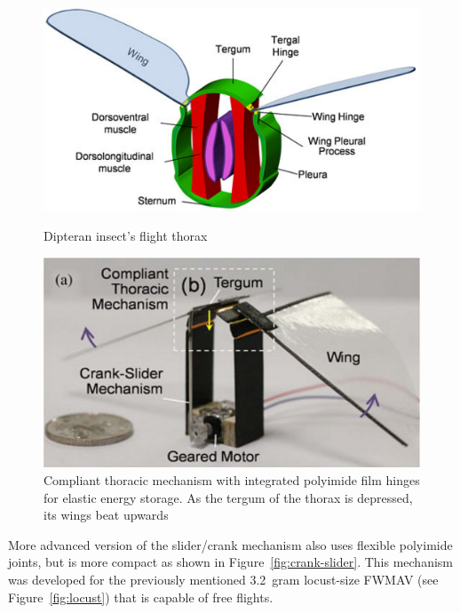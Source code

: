 \begin{figure}
\centering
{}
\includegraphics[width=\textwidth]{Files/Figures/thorax.png}
\caption[Dipteran insect’s flight thorax]{Dipteran insect’s flight thorax \cite{Lau2014} \newline \newline \newline}
\label{fig:thorax}
\endminipage\hfill
{}
\includegraphics[width=\textwidth]{Files/Figures/simple_crank.png}
\caption[Simple crank mechanism]{Compliant thoracic mechanism with integrated polyimide film hinges for elastic energy storage. As the tergum of the thorax is depressed, its wings beat upwards \cite{Lau2014}}
\label{fig:simple_crank}
\endminipage\hfill
\end{figure}

More advanced version of the slider/crank mechanism also uses flexible polyimide joints, but is more compact as shown in Figure~\ref{fig:crank-slider}. This mechanism was developed for the previously mentioned 3.2~gram locust-size FWMAV (see Figure~\ref{fig:locust}) that is capable of free flights.

